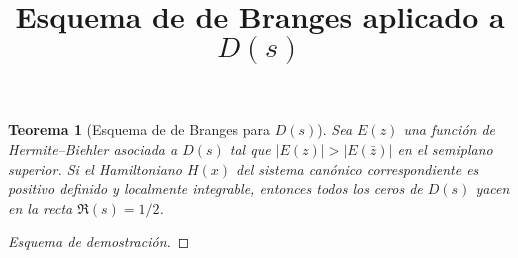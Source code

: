 \documentclass[12pt]{article}
\newtheorem{theorem}{Teorema}
\begin{document}
\title{Esquema de de Branges aplicado a $D(s)$}
\author{}
\date{}
\maketitle

\begin{theorem}[Esquema de de Branges para $D(s)$]
Sea $E(z)$ una función de Hermite--Biehler asociada a $D(s)$ tal que $|E(z)|>|E(\bar z)|$ en el semiplano superior.
Si el Hamiltoniano $H(x)$ del sistema canónico correspondiente es positivo definido y localmente integrable,
entonces todos los ceros de $D(s)$ yacen en la recta $\Re(s)=1/2$.
\end{theorem}

\begin{proof}[Esquema de demostración]
\end{proof}
\end{document}
